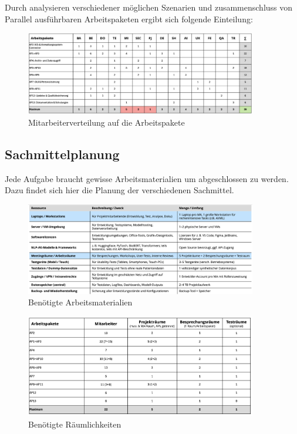 Durch analysieren verschiedener möglichen Szenarien und zusammenschluss von Parallel ausführbaren Arbeitspaketen ergibt sich folgende Einteilung:
\begin{figure}[ht]
	\centering
	\includegraphics[width=0.9\textwidth]{fig/arbeiter.png}
	\caption{Mitarbeiterverteilung auf die Arbeitspakete}
	\label{fig:arbeiter}
\end{figure}
\subsection{Sachmittelplanung}
Jede Aufgabe braucht gewisse Arbeitsmaterialien um abgeschlossen zu werden. Dazu findet sich hier die Planung der verschiedenen Sachmittel.

\begin{figure}[ht]
	\centering
	\includegraphics[width=0.9\textwidth]{fig/material.png}
	\caption{Benötigte Arbeitsmaterialien}
	\label{fig:material}
\end{figure}\begin{figure}
	\centering
	\includegraphics[width=0.9\textwidth]{fig/räume.png}
	\caption{Benötigte Räumlichkeiten}
	\label{fig:räume}
\end{figure}